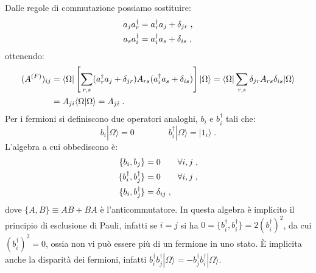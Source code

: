 \documentclass[10pt,a4paper]{report}
\theoremstyle{definition}
\numberwithin{equation}{section}
\newcommand{\bra}{\langle}
\newcommand{\ket}{\rangle}
\newcommand{\adj}[1]{#1^{\dagger}}
\begin{document}
Dalle regole di commutazione possiamo sostituire:
\begin{align}
a_j\adj{a}_r &= \adj{a}_ra_j+\delta_{jr} \notag\;, \\
a_s\adj{a}_i &= \adj{a}_ia_s+\delta_{is}\;,
\end{align}
ottenendo:
\begin{align}
(A^{(F)})_{ij}&= \bra\Omega|\left[\sum_{r,s}(\adj{a}_ra_j+\delta_{jr})A_{rs}(\adj{a}_ia_s+\delta_{is})\right]|\Omega\ket=\bra\Omega|\sum_{r,s}\delta_{jr}A_{rs}\delta_{is}|\Omega\ket \notag \\
&= A_{ji}\bra\Omega|\Omega\ket=A_{ji}\;.
\end{align}
Per i fermioni si definiscono due operatori analoghi, $b_i$ e $\adj{b}_i$ tali che:
$$
b_i|\Omega\ket=0 \qquad \qquad \adj{b}_i|\Omega\ket=|1_i\ket\;.
$$
L'algebra a cui obbediscono è:
\begin{align}
\{b_i,b_j\} &= 0 \qquad \forall i,j \notag\;, \\
\{\adj{b}_i,\adj{b}_j\} &= 0 \qquad \forall i,j\notag\;, \\
\{b_i,\adj{b}_j\}&=\delta_{ij}\;,
\end{align}
dove $\{A,B\}\equiv AB+BA$ è l'anticommutatore. In questa algebra è implicito il principio di esclusione di Pauli, infatti se $i=j$ si ha $0=\{\adj{b}_i,\adj{b}_i\}=2(\adj{b}_i)^2$, da cui $(\adj{b}_i)^2=0$, ossia non vi può essere più di un fermione in uno stato. È implicita anche la disparità dei fermioni, infatti $\adj{b}_i\adj{b}_j|\Omega\ket=-\adj{b}_j\adj{b}_i|\Omega\ket$.
\end{document}
